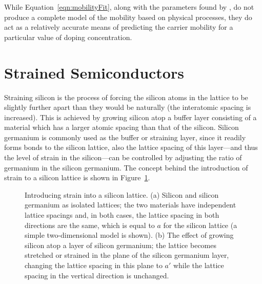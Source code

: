 \par 
While Equation~\ref{eqn:mobilityFit}, along with the parameters found by \textcite{Caughey1967}, do not produce a complete model of the mobility based on physical processes, they do act as a relatively accurate means of predicting the carrier mobility for a particular value of doping concentration.
%
\section{Strained Semiconductors} \label{sec:material-strain}
Straining silicon is the process of forcing the silicon atoms in the lattice to be slightly further apart than they would be naturally (the interatomic spacing is increased). This is achieved by growing silicon atop a buffer layer consisting of a material which has a larger atomic spacing than that of the silicon. Silicon germanium is commonly used as the buffer or straining layer, since it readily forms bonds to the silicon lattice, also the lattice spacing of this layer---and thus the level of strain in the silicon---can be controlled by adjusting the ratio of germanium in the silicon germanium. The concept behind the introduction of strain to a silicon lattice is shown in Figure~\ref{fig:strainFormation}.
\begin{figure}[t]
\begin{center}
\caption[Introducing strain into a silicon lattice]{Introducing strain into a silicon lattice. (a) Silicon and silicon germanium as isolated lattices; the two materials have independent lattice spacings and, in both cases, the lattice spacing in both directions are the same, which is equal to $a$ for the silicon lattice (a simple two-dimensional model is shown). (b) The effect of growing silicon atop a layer of silicon germanium; the lattice becomes stretched or strained in the plane of the silicon germanium layer, changing the lattice spacing in this plane to $a'$ while the lattice spacing in the vertical direction is unchanged.}
\label{fig:strainFormation}
\end{center}
\end{figure}
